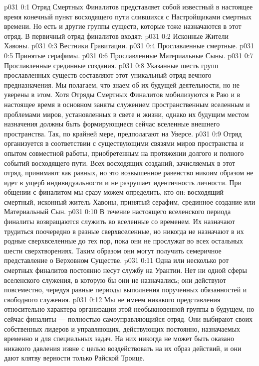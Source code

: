 \author{Божественный Советник и Не Имеющий Имени и Номера}
\vs p031 0:1 Отряд Смертных Финалитов представляет собой известный в настоящее время конечный пункт восходящего пути слившихся с Настройщиками смертных времени. Но есть и другие группы существ, которые тоже назначаются в этот отряд. В первичный отряд финалитов входят:
\vs p031 0:2 \bibnobreakspace Исконные Жители Хавоны.
\vs p031 0:3 \bibnobreakspace Вестники Гравитации.
\vs p031 0:4 \bibnobreakspace Прославленные смертные.
\vs p031 0:5 \bibnobreakspace Принятые серафимы.
\vs p031 0:6 \bibnobreakspace Прославленные Материальные Сыны.
\vs p031 0:7 \bibnobreakspace Прославленные срединные создания.
\vs p031 0:8 \pc Указанные шесть групп прославленных существ составляют этот уникальный отряд вечного предназначения. Мы полагаем, что знаем об их будущей деятельности, но не уверены в этом. Хотя Отряды Смертных Финалитов мобилизуются в Раю и в настоящее время в основном заняты служением пространственным вселенным и проблемами миров, установленных в свете и жизни, однако их будущим местом назначения должны быть формирующиеся сейчас вселенные внешнего пространства. Так, по крайней мере, предполагают на Уверсе.
\vs p031 0:9 Отряд организуется в соответствии с существующими связями миров пространства и опытом совместной работы, приобретенным на протяжении долгого и полного событий восходящего пути. Всех восходящих созданий, зачисляемых в этот отряд, принимают как равных, но это возвышенное равенство никоим образом не идет в ущерб индивидуальности и не разрушает идентичность личности. При общении с финалитом мы сразу можем определить, кто он: восходящий смертный, исконный житель Хавоны, принятый серафим, срединное создание или Материальный Сын.
\vs p031 0:10 В течение настоящего вселенского периода финалиты возвращаются служить во вселенные со временем. Их назначают трудиться поочередно в разные сверхвселенные, но никогда не назначают в их родные сверхвселенные до тех пор, пока они не прослужат во всех остальных шести сверхтворениях. Таким образом они могут получить семеричное представление о Верховном Существе.
\vs p031 0:11 Одна или несколько рот смертных финалитов постоянно несут службу на Урантии. Нет ни одной сферы вселенского служения, в которую бы они не назначались; они действуют повсеместно, чередуя равные периоды выполнения порученных обязанностей и свободного служения.
\vs p031 0:12 Мы не имеем никакого представления относительно характера организации этой необыкновенной группы в будущем, но сейчас финалиты --- полностью самоуправляющийся отряд. Они выбирают своих собственных лидеров и управляющих, действующих постоянно, назначаемых временно и для специальных задач. На них никогда не может быть оказано никакого давления извне с целью воздействовать на их образ действий, и они дают клятву верности только Райской Троице.
